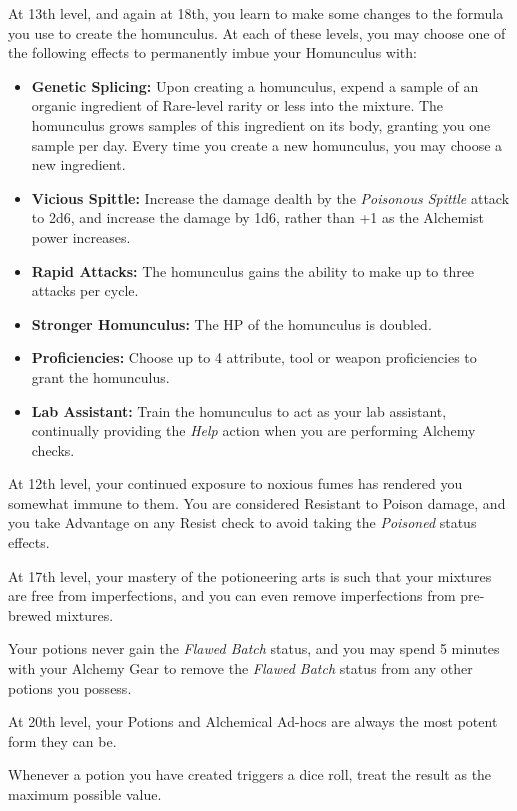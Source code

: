 {	At 13th level, and again at 18th, you learn to make some changes to the formula you use to create the homunculus. At each of these levels, you may choose one of the following effects to permanently imbue your Homunculus with:
	
	\newcommand\itList[2]{\item {\bf #1:} #2}
	
	\begin{itemize}
		\itList{Genetic Splicing}{Upon creating a homunculus, expend a sample of an organic ingredient of Rare-level rarity or less into the mixture. The homunculus grows samples of this ingredient on its body, granting you one sample per day. Every time you create a new homunculus, you may choose a new ingredient.}
		\itList{Vicious Spittle}{Increase the damage dealth by the {\it Poisonous Spittle} attack to 2d6, and increase the damage by 1d6, rather than +1 as the Alchemist power increases.}
		\itList{Rapid Attacks}{The homunculus gains the ability to make up to three attacks per cycle.}
		\itList{Stronger Homunculus}{The HP of the homunculus is doubled.}
		\itList{Proficiencies}{Choose up to 4 attribute, tool or weapon proficiencies to grant the homunculus.}
		\itList{Lab Assistant}{Train the homunculus to act as your lab assistant, continually providing the {\it Help} action when you are performing Alchemy checks.}
	\end{itemize}
	
}

{
	At 12th level, your continued exposure to noxious fumes has rendered you somewhat immune to them. You are considered Resistant to Poison damage, and you take Advantage on any Resist check to avoid taking the {\it Poisoned} status effects.
}

{
	At 17th level, your mastery of the potioneering arts is such that your mixtures are free from imperfections, and you can even remove imperfections from pre-brewed mixtures. 
	
	Your potions never gain the {\it Flawed Batch} status, and you may spend 5 minutes with your Alchemy Gear to remove the {\it Flawed Batch} status from any other potions you possess.
}

{
	At 20th level, your Potions and Alchemical Ad-hocs are always the most potent form they can be. 
	
	Whenever a potion you have created triggers a dice roll, treat the result as the maximum possible value.
}


